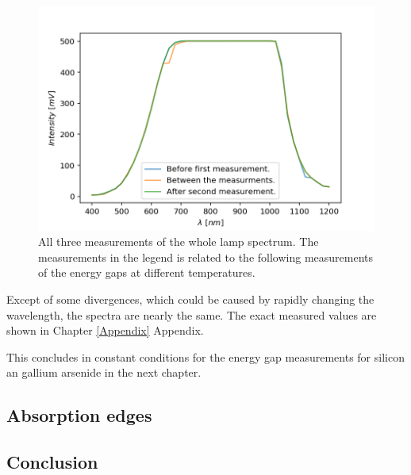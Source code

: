\documentclass[]{article}
\begin{document}
\begin{figure}[H]
\centering
\includegraphics[width=.8\textwidth]{Plots/All-Lamp-Spectra.png}
\caption{All three measurements of the whole lamp spectrum. The measurements in the legend is related to the following measurements of the energy gaps at different temperatures. }
\label{fig:lamp spectra}
\end{figure} 

Except of some divergences, which could be caused by rapidly changing the wavelength, the spectra are nearly the same. The exact measured values are shown in Chapter \ref{Appendix} Appendix. 

This concludes in constant conditions for the energy gap measurements for silicon an gallium arsenide in the next chapter.

\subsection{Absorption edges}
\subsection{Conclusion}

\newpage
\end{document}
